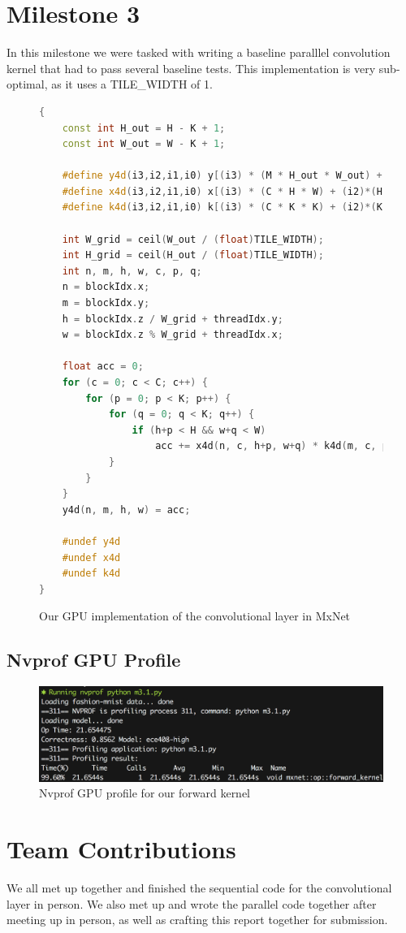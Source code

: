 \documentclass[titlepage]{article}
\begin{document}
\newpage
\section*{Milestone 3}
In this milestone we were tasked with writing a baseline paralllel convolution kernel that had to pass several baseline tests. This implementation is very sub-optimal, as it uses a TILE\_WIDTH of 1.
\begin{figure}[h!]
\begin{lstlisting}[language=C++]
{
    const int H_out = H - K + 1;
    const int W_out = W - K + 1;
    
    #define y4d(i3,i2,i1,i0) y[(i3) * (M * H_out * W_out) + (i2)*(H_out * W_out) + (i1)*(W_out) + i0]
    #define x4d(i3,i2,i1,i0) x[(i3) * (C * H * W) + (i2)*(H * W) + (i1)*(W) + i0]
    #define k4d(i3,i2,i1,i0) k[(i3) * (C * K * K) + (i2)*(K * K) + (i1)*(K) + i0]

    int W_grid = ceil(W_out / (float)TILE_WIDTH);
    int H_grid = ceil(H_out / (float)TILE_WIDTH);
    int n, m, h, w, c, p, q;
    n = blockIdx.x;
    m = blockIdx.y;
    h = blockIdx.z / W_grid + threadIdx.y;
    w = blockIdx.z % W_grid + threadIdx.x;
    
    float acc = 0;
    for (c = 0; c < C; c++) {
        for (p = 0; p < K; p++) {
            for (q = 0; q < K; q++) {
                if (h+p < H && w+q < W)
                    acc += x4d(n, c, h+p, w+q) * k4d(m, c, p, q);
            }
        }
    }
    y4d(n, m, h, w) = acc;

    #undef y4d
    #undef x4d
    #undef k4d
}
\end{lstlisting}
\caption{Our GPU implementation of the convolutional layer in MxNet}
\end{figure}

\newpage
\subsection*{Nvprof GPU Profile}
\begin{figure}[h!]
\includegraphics[width=\linewidth]{nvprof.png}
\caption{Nvprof GPU profile for our forward kernel}
\label{fig:flowFree}
\end{figure}


\section*{Team Contributions}
We all met up together and finished the sequential code for the convolutional layer in person. We also met up and wrote the parallel code together after meeting up in person, as well as crafting this report together for submission.
\end{document}
